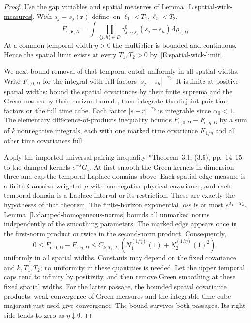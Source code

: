 \documentclass[12pt]{article}
\numberwithin{equation}{section}
\theoremstyle{definition}
\newcommand{\ud}{\,\mathrm{d}}
\begin{document}
\begin{proof}
  Use the gap variables and spatial measures of
  Lemma~\ref{L:spatial-wick-measures}. With $s_j=s_j(\boldsymbol r)$
  define, on $\ell_1<T_1,\ell_2<T_2$,
  \[
    F_{\boldsymbol\epsilon,\boldsymbol\delta,D}
    =\int\prod_{\{j,h\}\in D}
    \gamma^0_{\delta_j\vee\delta_h}(s_j-s_h)
    \ud\rho_{\boldsymbol\epsilon,D}.
  \]
  At a common temporal width $\eta>0$ the multiplier is bounded and
  continuous. Hence the spatial limit exists at every $T_1,T_2>0$
  by~\eqref{E:spatial-wick-limit}.

  We next bound removal of that temporal cutoff uniformly in all spatial
  widths. Write $F_{\boldsymbol\epsilon,0,D}$ for the integral with
  full factors $|s_j-s_h|^{-\alpha_0}$.
  It is finite at positive spatial widths: bound the spatial covariances
  by their finite suprema and the Green masses by their horizon bounds,
  then integrate the disjoint-pair time factors on the full time cube.
  Each factor $|s-r|^{-\alpha_0}$ is integrable since $\alpha_0<1$.
  The elementary difference-of-products inequality bounds
  $F_{\boldsymbol\epsilon,0,D}-F_{\boldsymbol\epsilon,\eta,D}$ by a sum
  of $k$ nonnegative integrals, each with one marked time covariance
  $K_{1/\eta}$ and all other time covariances full.

  Apply the imported universal pairing inequality
  \cite{chen:author2026:time-dependency}*{Theorem~3.1, (3.6), pp.~14--15}
  to the damped kernels $e^{-s}G_s$. At first smooth the Green kernels
  in dimension three and cap the temporal Laplace domains above.
  Each spatial edge measure is a finite Gaussian-weighted $\mu$ with
  nonnegative physical covariance, and each temporal domain is a
  Laplace interval or its restriction. These are exactly the hypotheses
  of that theorem. The finite-horizon exponential loss is at most
  $e^{T_1+T_2}$. Lemma~\ref{L:damped-homogeneous-norms} bounds all
  unmarked norms independently of the smoothing parameters. The marked
  edge appears once in the first-norm product or twice in the
  second-norm product. Consequently,
  \begin{equation}\label{E:joint-temporal-tail}
    0\le F_{\boldsymbol\epsilon,0,D}
    -F_{\boldsymbol\epsilon,\eta,D}
    \le C_{k,T_1,T_2}
    \left(N_1^{(1/\eta)}(1)+N_2^{(1/\eta)}(1)^2\right),
  \end{equation}
  uniformly in all spatial widths. Constants may depend on the fixed
  covariance and $k,T_1,T_2$; no uniformity in these quantities is needed.
  Let the upper temporal caps tend to infinity by positivity, and then
  remove Green smoothing at these fixed spatial widths. For the latter
  passage, the bounded spatial covariance products, weak convergence
  of Green measures and the integrable time-cube majorant just used
  give convergence. The bound survives both passages.
  Its right side tends to zero as $\eta\downarrow0$.


\end{proof}
\end{document}
